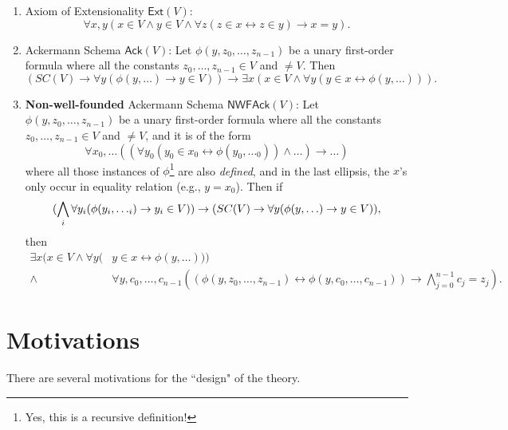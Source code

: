 \documentclass{article}
\begin{document}
\begin{enumerate}
    \item Axiom of Extensionality $\textsf{Ext}(V)$: $$\forall x, y (x \in V \wedge y \in V \wedge \forall z(z\in x \leftrightarrow z \in y) \rightarrow x = y).$$
    \item Ackermann Schema $\textsf{Ack}(V)$: Let $\phi(y, z_0, \ldots, z_{n-1})$ be a unary first-order formula where all the constants $z_0, \ldots, z_{n-1} \in V$ and $\ne V$. Then $$(SC(V) \rightarrow \forall y(\phi(y, \ldots) \rightarrow y \in V)) \rightarrow \exists x(x \in V \wedge \forall y(y \in x \leftrightarrow \phi(y, \ldots))).$$
    \item \textbf{Non-well-founded} Ackermann Schema $\textsf{NWFAck}(V)$: Let $\phi(y, z_0, \ldots, z_{n-1})$ be a unary first-order formula where all the constants $z_0, \ldots, z_{n-1} \in V$ and $\ne V$, and it is of the form
$$\forall x_0, \ldots ((\forall y_0(y_0 \in x_0 \leftrightarrow \phi(y_0, \ldots_0)) \wedge \ldots) \rightarrow \ldots)$$
where all those instances of $\phi$\footnote{Yes, this is a recursive definition!} are also \textit{defined}, and in the last ellipsis, the $x$'s only occur in equality relation (e.g., $y = x_0$). Then if
$$(\bigwedge_i \forall y_i( \phi(y_i, \ldots_i) \rightarrow y_i \in V)) \rightarrow \\ (SC(V) \rightarrow \forall y(\phi(y, \ldots) \rightarrow y \in V)),$$
then
\begin{align*}
    \exists x(x \in V \wedge \forall y(&y \in x \leftrightarrow \phi(y, \ldots))) \\ \wedge\ &\forall y, c_0, \ldots, c_{n-1} ((\phi(y, z_0, \ldots, z_{n-1}) \leftrightarrow \phi(y, c_0, \ldots, c_{n-1})) \rightarrow \bigwedge_{j=0}^{n-1} {c_j = z_j}).
\end{align*}
\end{enumerate}

\section{Motivations}
There are several motivations for the ``design" of the theory.\\
\end{document}
